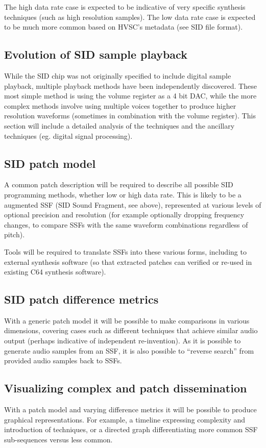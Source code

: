 \documentclass[10pt]{article}
\begin{document}
\begin{multicols*}{2}
  The high data rate case is expected to be indicative of very
  specific synthesis techniques (such as high resolution samples).
  The low data rate case is expected to be much more common based
  on HVSC's metadata (see SID file format).

    \subsection{Evolution of SID sample playback}
  While the SID chip was not originally specified to include digital
  sample playback, multiple playback methods have been independently
  discovered. These most simple method is using the volume register
  as a 4 bit DAC, while the more complex methods involve using
  multiple voices together to produce higher resolution waveforms
  (sometimes in combination with the volume register). This
  section will include a detailed analysis of the techniques and
  the ancillary techniques (eg. digital signal processing).

  \subsection{SID patch model}
  A common patch description will be required to describe all possible
  SID programming methods, whether low or high data rate. This is
  likely to be a augmented SSF (SID Sound Fragment, see above),
  represented at various levels of optional precision and resolution
  (for example optionally dropping frequency changes, to compare SSFs
  with the same waveform combinations regardless of pitch).

  Tools will be required to translate SSFs into these various forms,
  including to external synthesis software (so that extracted patches
  can verified or re-used in existing C64 synthesis software).

  \subsection{SID patch difference metrics}
  With a generic patch model it will be possible to make comparisons
  in various dimensions, covering cases such as different techniques
  that achieve similar audio output (perhaps indicative of
  independent re-invention). As it is possible to generate audio
  samples from an SSF, it is also possible to ``reverse search'' from
  provided audio samples back to SSFs.

  \subsection{Visualizing complex and patch dissemination}
  With a patch model and varying difference metrics it will be
  possible to produce graphical representations. For example, a
  timeline expressing complexity and introduction of techniques,
  or a directed graph differentiating more common SSF sub-sequences
  versus less common.


\end{multicols*}
\end{document}
